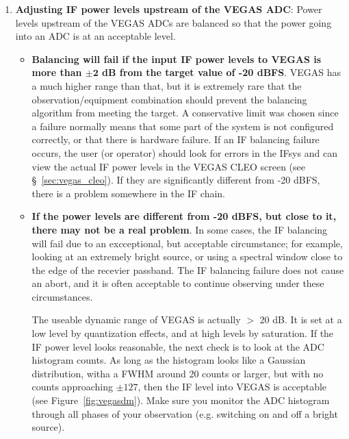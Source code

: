 \begin{enumerate}[label=\bfseries{\arabic*.},leftmargin=*,
labelindent=\parindent]
\item {\bf Adjusting \gls{IF} power levels upstream of the \gls{VEGAS} \gls{ADC}}:
Power levels upstream of the \gls{VEGAS} \glspl{ADC} are balanced so that the
power going into an \gls{ADC} is at an acceptable level.

\begin{itemize}[leftmargin=*]
\item {\bf Balancing will fail if the input \gls{IF} power levels to \gls{VEGAS}
is more than $\mathbf{\pm 2}$ dB from the target value of -20 dBFS}. \gls{VEGAS}
has a much higher range than that, but it is extremely rare that the
observation/equipment combination should prevent the balancing algorithm from
meeting the target.  A conservative limit was chosen since a failure normally
means that some part of the system is not configured correctly, or that there
is hardware failure.  If an \gls{IF} balancing failure occurs, the user
(or operator) should look for errors in the \gls{IFsys} and can view
the actual \gls{IF} power levels in the \gls{VEGAS} \gls{CLEO} screen
(see \S~\ref{sec:vegas_cleo}).  If they are significantly different from
-20 dBFS, there is a problem somewhere in the \gls{IF} chain.

\item {\bf If the power levels are different from -20 dBFS, but close to it,
there may not be a real problem}.  In some cases, the \gls{IF} balancing will
fail due to an excceptional, but acceptable circumstance; for example, looking
at an extremely bright source, or using a spectral window close to the edge
of the recevier passband.  The \gls{IF} balancing failure does not cause an
abort, and it is often acceptable to continue observing under these circumstances.

The useable dynamic range of \gls{VEGAS} is actually $>$ 20 dB.  It is set at a
low level by quantization effects, and at high levels by saturation.  If the
\gls{IF} power level looks reasonable, the next check is to look at the
\gls{ADC} histogram counts.  As long as the histogram looks like a Gaussian
distribution, witha a FWHM around 20 counts or larger, but with no counts
approaching $\pm 127$, then the \gls{IF} level into \gls{VEGAS} is acceptable
(see Figure~\ref{fig:vegasdm}).  Make sure you monitor the \gls{ADC} histogram
through all phases of your observation (e.g. switching on and off a bright source).
\end{itemize}


\end{enumerate}
